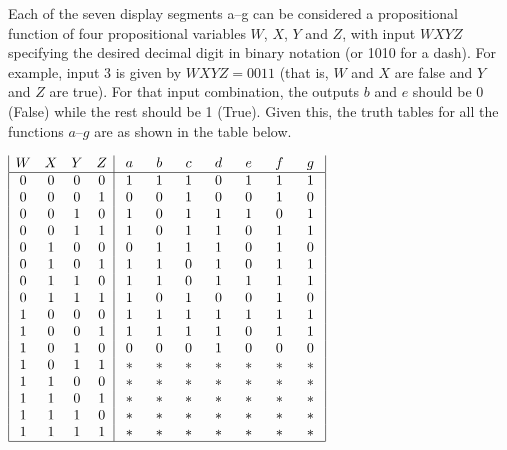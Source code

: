 \documentclass[12pt]{article}
\begin{document}
Each of the seven display segments a--g can be considered a propositional
function of four propositional variables $W$, $X$, $Y$ and $Z$, with
input $WXYZ$ specifying the desired decimal digit in binary notation
(or 1010 for a dash).
For example, input 3 is given by $WXYZ = 0011$ 
(that is, $W$ and $X$ are false and $Y$ and $Z$ are true).
For that input combination, the outputs $b$ and $e$ should be 0
(False) while the rest should be 1 (True).
Given this, the truth tables for all the functions $a$--$g$ are as 
shown in the table below.
\bigskip

\begin{minipage}{0.6\textwidth}
\qquad
$\begin{array}{|cccc|ccccccc|}
   W & X & Y & Z & ~a~ & ~b~ & ~c~ & ~d~ & ~e~ & ~f~ & ~g~
\\ \hline
   0 & 0 & 0 & 0 & 1 & 1 & 1 & 0 & 1 & 1 & 1 
\\ 0 & 0 & 0 & 1 & 0 & 0 & 1 & 0 & 0 & 1 & 0 
\\ 0 & 0 & 1 & 0 & 1 & 0 & 1 & 1 & 1 & 0 & 1 
\\ 0 & 0 & 1 & 1 & 1 & 0 & 1 & 1 & 0 & 1 & 1 
\\ 0 & 1 & 0 & 0 & 0 & 1 & 1 & 1 & 0 & 1 & 0 
\\ 0 & 1 & 0 & 1 & 1 & 1 & 0 & 1 & 0 & 1 & 1 
\\ 0 & 1 & 1 & 0 & 1 & 1 & 0 & 1 & 1 & 1 & 1 
\\ 0 & 1 & 1 & 1 & 1 & 0 & 1 & 0 & 0 & 1 & 0 
\\ 1 & 0 & 0 & 0 & 1 & 1 & 1 & 1 & 1 & 1 & 1 
\\ 1 & 0 & 0 & 1 & 1 & 1 & 1 & 1 & 0 & 1 & 1 
\\ 1 & 0 & 1 & 0 & 0 & 0 & 0 & 1 & 0 & 0 & 0 
\\ 1 & 0 & 1 & 1 & * & * & * & * & * & * & * 
\\ 1 & 1 & 0 & 0 & * & * & * & * & * & * & * 
\\ 1 & 1 & 0 & 1 & * & * & * & * & * & * & * 
\\ 1 & 1 & 1 & 0 & * & * & * & * & * & * & * 
\\ 1 & 1 & 1 & 1 & * & * & * & * & * & * & * 
\\ \hline
\multicolumn{10}{c}{~}
\end{array}$
\end{minipage}
\qquad
\end{document}
